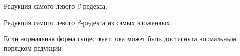 \begin{definition}
	Редукция самого левого $\beta$-редекса.
\end{definition}

\begin{definition}
	Редукция самого левого $\beta$-редекса из самых вложенных.
\end{definition}

\begin{statement}
	Если нормальная форма существует, она может быть достигнута нормальным порядком редукции.
\end{statement}